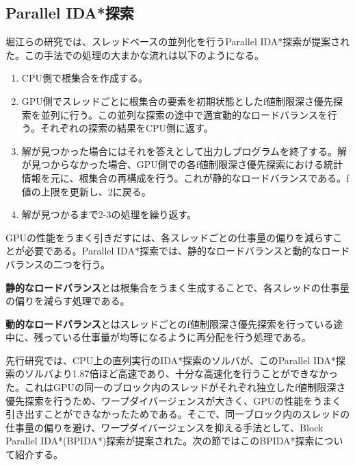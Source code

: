 \documentclass[a4paper,11pt,oneside,openany]{jsbook}
\begin{document}
\subsection{Parallel IDA*探索}
堀江らの研究\cite{HA17}では、スレッドベースの並列化を行うParallel IDA*探索が提案された。この手法での処理の大まかな流れは以下のようになる。
\begin{enumerate}
 \item CPU側で根集合を作成する。
 \item GPU側でスレッドごとに根集合の要素を初期状態としたf値制限深さ優先探索を並列に行う。この並列な探索の途中で適宜動的なロードバランスを行う。それぞれの探索の結果をCPU側に返す。
 \item 解が見つかった場合にはそれを答えとして出力しプログラムを終了する。解が見つからなかった場合、GPU側での各f値制限深さ優先探索における統計情報を元に、根集合の再構成を行う。これが静的なロードバランスである。f値の上限を更新し、2に戻る。
 \item 解が見つかるまで2-3の処理を繰り返す。
\end{enumerate}

GPUの性能をうまく引きだすには、各スレッドごとの仕事量の偏りを減らすことが必要である。Parallel IDA*探索では、静的なロードバランスと動的なロードバランスの二つを行う。

{\bf 静的なロードバランス}とは根集合をうまく生成することで、各スレッドの仕事量の偏りを減らす処理である。

{\bf 動的なロードバランス}とはスレッドごとのf値制限深さ優先探索を行っている途中に、残っている仕事量が均等になるように再分配を行う処理である。

先行研究\cite{HA17}では、CPU上の直列実行のIDA*探索のソルバが、このParallel IDA*探索のソルバより1.87倍ほど高速であり、十分な高速化を行うことができなかった。これはGPUの同一のブロック内のスレッドがそれぞれ独立したf値制限深さ優先探索を行うため、ワープダイバージェンスが大きく、GPUの性能をうまく引き出すことができなかったためである。そこで、同一ブロック内のスレッドの仕事量の偏りを避け、ワープダイバージェンスを抑える手法として、Block Parallel IDA*(BPIDA*)探索\cite{HA17}が提案された。次の節ではこのBPIDA*探索について紹介する。
\end{document}
